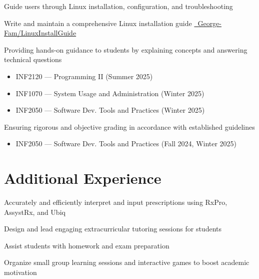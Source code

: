 \documentclass[letterpaper,10pt]{article}
\begin{document}
  \begin{resume_list}
      \item Guide users through Linux installation, configuration, and troubleshooting
      \item Write and maintain a comprehensive Linux installation guide {\small \href{https://github.com/George-Fam/LinuxInstallGuide}{\faGithubSquare\ George-Fam/LinuxInstallGuide}}
	\vspace{3pt}
      \item Providing hands-on guidance to students by explaining concepts and answering technical questions
	  \begin{itemize}
        \item INF2120 — Programming II (Summer 2025)
        \item INF1070 — System Usage and Administration (Winter 2025)
        \item INF2050 — Software Dev. Tools and Practices (Winter 2025)
      \end{itemize}
   \vspace{3pt}
      \item Ensuring rigorous and objective grading in accordance with established guidelines
      \begin{itemize}
        \item INF2050 — Software Dev. Tools and Practices (Fall 2024, Winter 2025)
      \end{itemize}
  \end{resume_list}

   \section{Additional Experience}

  \begin{resume_list}
    \item Accurately and efficiently interpret and input prescriptions using RxPro, AssystRx, and Ubiq
  \end{resume_list}

  \begin{resume_list}
    \item Design and lead engaging extracurricular tutoring sessions for students
    \item Assist students with homework and exam preparation
    \item Organize small group learning sessions and interactive games to boost academic motivation
  \end{resume_list}
\end{document}
